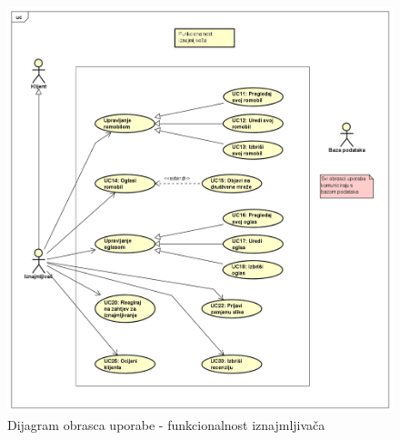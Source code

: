 					\begin{figure} [H]
						
						\includegraphics[width=1\linewidth]{dijagrami/iznajmljivac.png}
						\centering
						\caption{Dijagram obrasca uporabe - funkcionalnost iznajmljivača}
						\label{fig:Dijagram obrasca uporabe - funkcionalnost iznajmljivača}
					\end{figure}
					
